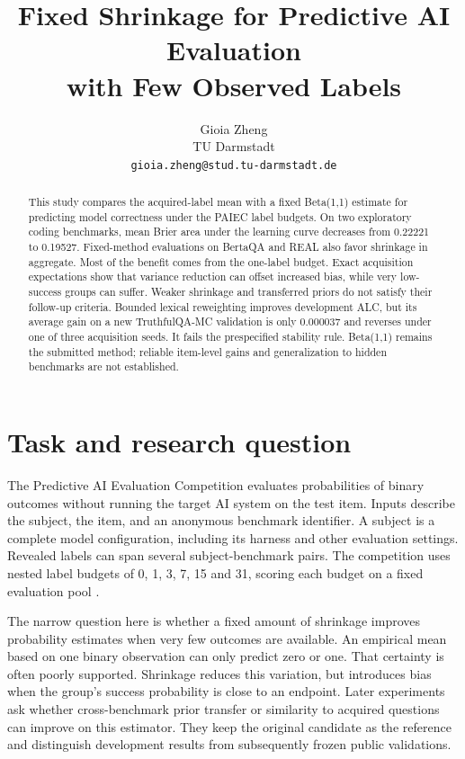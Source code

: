 \documentclass{article}
\title{Fixed Shrinkage for Predictive AI Evaluation\\with Few Observed Labels}
\author{Gioia Zheng\\TU Darmstadt\\\texttt{gioia.zheng@stud.tu-darmstadt.de}}
\begin{document}
\maketitle
\begin{abstract}
This study compares the acquired-label mean with a fixed Beta(1,1) estimate for predicting model correctness under the PAIEC label budgets. On two exploratory coding benchmarks, mean Brier area under the learning curve decreases from 0.22221 to 0.19527. Fixed-method evaluations on BertaQA and REAL also favor shrinkage in aggregate. Most of the benefit comes from the one-label budget. Exact acquisition expectations show that variance reduction can offset increased bias, while very low-success groups can suffer. Weaker shrinkage and transferred priors do not satisfy their follow-up criteria. Bounded lexical reweighting improves development ALC, but its average gain on a new TruthfulQA-MC validation is only 0.000037 and reverses under one of three acquisition seeds. It fails the prespecified stability rule. Beta(1,1) remains the submitted method; reliable item-level gains and generalization to hidden benchmarks are not established.
\end{abstract}
\section{Task and research question}\label{task-and-research-question}

The Predictive AI Evaluation Competition evaluates probabilities of binary outcomes without running the target AI system on the test item. Inputs describe the subject, the item, and an anonymous benchmark identifier. A subject is a complete model configuration, including its harness and other evaluation settings. Revealed labels can span several subject-benchmark pairs. The competition uses nested label budgets of 0, 1, 3, 7, 15 and 31, scoring each budget on a fixed evaluation pool \cite{ref1}.

The narrow question here is whether a fixed amount of shrinkage improves probability estimates when very few outcomes are available. An empirical mean based on one binary observation can only predict zero or one. That certainty is often poorly supported. Shrinkage reduces this variation, but introduces bias when the group's success probability is close to an endpoint. Later experiments ask whether cross-benchmark prior transfer or similarity to acquired questions can improve on this estimator. They keep the original candidate as the reference and distinguish development results from subsequently frozen public validations.
\end{document}
